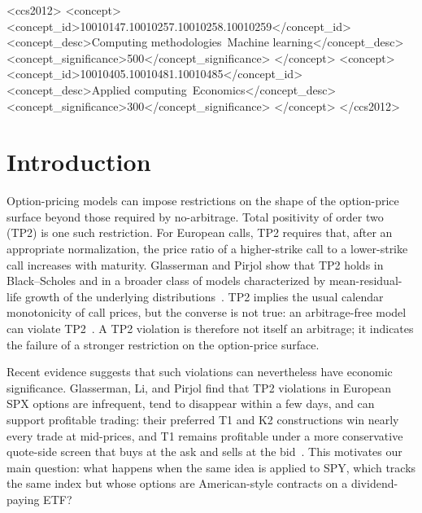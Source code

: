 \documentclass[sigconf]{acmart}
\begin{document}
\begin{CCSXML}
<ccs2012>
 <concept>
  <concept_id>10010147.10010257.10010258.10010259</concept_id>
  <concept_desc>Computing methodologies~Machine learning</concept_desc>
  <concept_significance>500</concept_significance>
 </concept>
 <concept>
  <concept_id>10010405.10010481.10010485</concept_id>
  <concept_desc>Applied computing~Economics</concept_desc>
  <concept_significance>300</concept_significance>
 </concept>
</ccs2012>
\end{CCSXML}



\maketitle

\section{Introduction}
\label{sec:intro}

Option-pricing models can impose restrictions on the shape of the option-price surface beyond those required by no-arbitrage. Total positivity of order two (TP2) is one such restriction. For European calls, TP2 requires that, after an appropriate normalization, the price ratio of a higher-strike call to a lower-strike call increases with maturity. Glasserman and Pirjol show that TP2 holds in Black--Scholes and in a broader class of models characterized by mean-residual-life growth of the underlying distributions~\cite{glasserman2026tp2theory}. TP2 implies the usual calendar monotonicity of call prices, but the converse is not true: an arbitrage-free model can violate TP2~\cite{glasserman2026tp2theory,glasserman2023convexity}. A TP2 violation is therefore not itself an arbitrage; it indicates the failure of a stronger restriction on the option-price surface.

Recent evidence suggests that such violations can nevertheless have economic significance. Glasserman, Li, and Pirjol find that TP2 violations in European SPX options are infrequent, tend to disappear within a few days, and can support profitable trading: their preferred T1 and K2 constructions win nearly every trade at mid-prices, and T1 remains profitable under a more conservative quote-side screen that buys at the ask and sells at the bid~\cite{glasserman2025tp2}. This motivates our main question: what happens when the same idea is applied to SPY, which tracks the same index but whose options are American-style contracts on a dividend-paying ETF?
\end{document}
